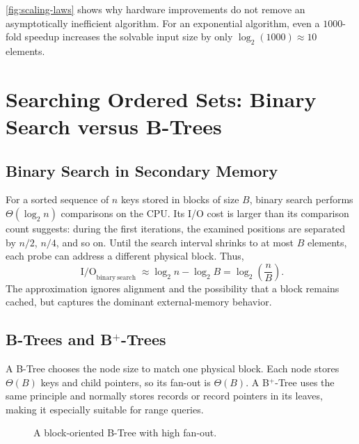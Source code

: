 \autoref{fig:scaling-laws} shows why hardware improvements do not remove an
asymptotically inefficient algorithm. For an exponential algorithm, even a
$1000$-fold speedup increases the solvable input size by only
$\log_2(1000)\approx 10$ elements.

\section{Searching Ordered Sets: Binary Search versus B-Trees}
\label{sec:binary-search-btrees}

\subsection{Binary Search in Secondary Memory}
\label{subsec:external-binary-search}

For a sorted sequence of $n$ keys stored in blocks of size $B$, binary search
performs $\Theta(\log_2 n)$ comparisons on the CPU. Its I/O cost is larger
than its comparison count suggests: during the first iterations, the examined
positions are separated by $n/2$, $n/4$, and so on. Until the search interval
shrinks to at most $B$ elements, each probe can address a different physical
block. Thus,
\[
  \operatorname{I/O}_{\mathrm{binary\ search}}
  \approx \log_2 n-\log_2 B
  = \log_2\!\left(\frac{n}{B}\right).
\]
The approximation ignores alignment and the possibility that a block remains
cached, but captures the dominant external-memory behavior.

\subsection{B-Trees and \texorpdfstring{B$^+$-Trees}{B+-Trees}}
\label{subsec:btree}

A B-Tree chooses the node size to match one physical block. Each node stores
$\Theta(B)$ keys and child pointers, so its fan-out is $\Theta(B)$. A B$^+$-Tree
uses the same principle and normally stores records or record pointers in its
leaves, making it especially suitable for range queries.

\begin{figure}[H]
  \centering
  \caption{A block-oriented B-Tree with high fan-out.}
  \label{fig:btree}
\end{figure}

